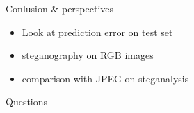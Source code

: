 \documentclass[11pt,compress]{beamer} %
\begin{document}
\begin{frame}{Conlusion \& perspectives}
  \begin{itemize}
    \item Look at prediction error on test set
    \item steganography on RGB images
    \item comparison with JPEG on steganalysis
  \end{itemize}
\end{frame}

\begin{frame}
  \centering
  Questions
\end{frame}

\end{document}
